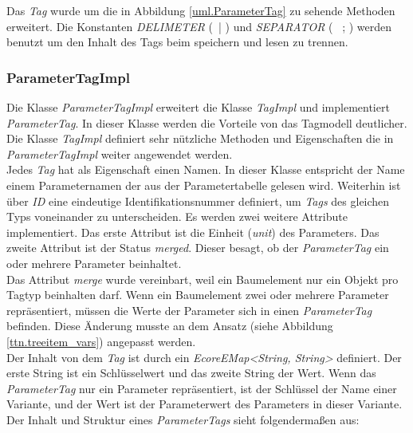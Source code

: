 Das \textit{Tag} wurde um die in Abbildung \ref{uml.ParameterTag} zu sehende Methoden erweitert. Die Konstanten \textit{DELIMETER} (\glqq~| \grqq) und \textit{SEPARATOR} (\glqq~ ; \grqq) werden benutzt um den Inhalt des Tags beim speichern und lesen zu trennen.

\subsubsection{ParameterTagImpl}
Die Klasse \textit{ParameterTagImpl} erweitert die Klasse \textit{TagImpl} und implementiert \textit{ParameterTag}. In dieser Klasse werden die Vorteile von das Tagmodell deutlicher. Die Klasse \textit{TagImpl} definiert sehr nützliche Methoden und Eigenschaften die in \textit{ParameterTagImpl} weiter angewendet werden.\\


Jedes \textit{Tag} hat als Eigenschaft einen Namen. In dieser Klasse entspricht der Name einem Parameternamen der aus der Parametertabelle gelesen wird. Weiterhin ist über \textit{ID} eine eindeutige Identifikationsnummer definiert, um \textit{Tags} des gleichen Typs voneinander zu unterscheiden. Es werden zwei weitere Attribute implementiert. Das erste Attribut ist die Einheit (\textit{unit}) des Parameters. Das zweite Attribut ist der Status \textit{merged}. Dieser besagt, ob der \textit{ParameterTag} ein oder mehrere Parameter beinhaltet. \\

Das Attribut \textit{merge} wurde vereinbart, weil ein Baumelement nur ein Objekt pro Tagtyp beinhalten darf. Wenn ein Baumelement zwei oder mehrere Parameter repräsentiert, müssen die Werte der Parameter sich in einen \textit{ParameterTag} befinden. Diese Änderung musste an dem Ansatz (siehe Abbildung \ref{ttn.treeitem_vars}) angepasst werden.\\

Der Inhalt von dem \textit{Tag} ist durch ein \textit{EcoreEMap<String, String>} definiert. Der erste String ist ein Schlüsselwert und das zweite String der Wert. Wenn das \textit{ParameterTag} nur ein Parameter repräsentiert, ist der Schlüssel der Name einer Variante, und der Wert ist der Parameterwert des Parameters in dieser Variante. Der Inhalt und Struktur eines \textit{ParameterTags} sieht folgendermaßen aus:\\

